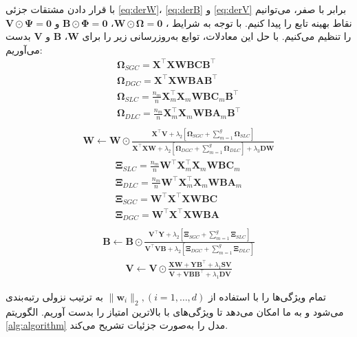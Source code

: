 با قرار دادن مشتقات جزئی \eqref{eq:derW}، \eqref{eq:derB} و \eqref{eq:derV} برابر با صفر، می‌توانیم نقاط بهینه تابع را پیدا کنیم. با توجه به شرایط 
، $\bm{W}\odot\bm{\Omega}=\bm{0}$، $\bm{B}\odot\bm{\Phi}=\bm{0}$ و $\bm{V}\odot\bm{\Psi}=\bm{0}$ را تنظیم می‌کنیم. با حل این معادلات، توابع به‌روزرسانی زیر را برای $\bm{W}$، $\bm{B}$ و $\bm{V}$ بدست می‌آوریم:‎\\
\begin{align*}
	&\bm{\Omega}_{SGC}=\bm{X}^\top \bm{XWBCB}^\top & \\
	&\bm{\Omega}_{DGC}=\bm{X}^\top \bm{XWBAB}^\top & \\
	&\bm{\Omega}_{SLC}=\frac{n_m}{n}\bm{X}^\top_m \bm{X}_m\bm{WBC}_m\bm{B}^\top & \\
	&\bm{\Omega}_{DLC}=\frac{n_m}{n}\bm{X}^\top_m\bm{X}_m\bm{WBA}_m\bm{B}^\top & \\
\end{align*}
\begin{align}\label{eq:updW}
	\bm{W} \leftarrow \bm{W} \odot \frac{\bm{X}^\top \bm{V} + \lambda_2[\bm{\Omega}_{SGC}+ \sum_{m=1}^{g}\bm{\Omega}_{SLC}]}
	{\bm{X}^\top \bm{XW} + \lambda_2[\bm{\Omega}_{DGC} +\sum_{m=1}^{g}\bm{\Omega}_{DLC}]+\lambda_3\bm{DW}}
\end{align}
\begin{align*}
	&\bm{\Xi}_{SLC}=\frac{n_m}{n}\bm{W}^\top \bm{X}^\top_m \bm{X}_m\bm{WBC}_m & \\
	&\bm{\Xi}_{DLC}=\frac{n_m}{n}\bm{W}^\top \bm{X}^\top_m \bm{X}_m\bm{WBA}_m & \\
	&\bm{\Xi}_{SGC}=\bm{W}^\top \bm{X}^\top \bm{XWBC} & \\
	&\bm{\Xi}_{DGC}=\bm{W}^\top \bm{X}^\top \bm{XWBA} & \\
\end{align*}
\begin{align}\label{eq:updB}
	\bm{B} \leftarrow \bm{B}\odot \frac{\bm{V}^\top \bm{Y} +\lambda_2[\bm{\Xi}_{SGC} +\sum_{m=1}^{g} \bm{\Xi}_{SLC} ]}{\bm{V}^\top \bm{VB} + \lambda_2[\bm{\Xi}_{DGC} +\sum_{m=1}^{g} \bm{\Xi}_{DLC}] }
\end{align}
\begin{align}\label{eq:updV}
	\bm{V} \leftarrow \bm{V} \odot \frac{\bm{XW} + \bm{YB}^\top + \lambda_1 \bm{SV}}{\bm{V} +\bm{VBB}^\top + \lambda_1 \bm{DV}}
\end{align}

 تمام ویژگی‌ها را با استفاده از $\lVert \bm{w}_i\lVert_2, (i=1,{\dots},{d})$ به ترتیب نزولی رتبه‌بندی می‌شود و به ما امکان می‌دهد تا ویژگی‌های با بالاترین امتیاز را بدست‌ آوریم. الگوریتم \ref{alg:algorithm} مدل  را به‌صورت جزئیات تشریح می‌کند.

